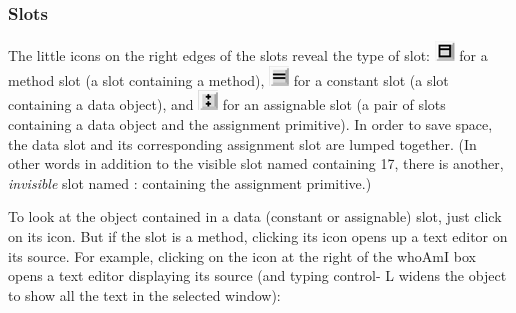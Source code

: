 \documentclass[letterpaper,10pt,english]{sphinxmanual}
\begin{document}
\subsubsection{Slots}
\label{howtoprg:slots}
The little icons on the right edges of the slots reveal the type of slot: \includegraphics{methodslot.png} for a method slot (a slot
containing a method), \includegraphics{constantslot.png} for a constant slot (a slot containing a data object), and \includegraphics{assignableslot.png} for an assignable
slot (a pair of slots containing a data object and the assignment primitive). In order to save
space, the data slot and its corresponding assignment slot are lumped together. (In other words in
addition to the visible slot named  containing 17, there is another, \emph{invisible}
slot named : containing the assignment primitive.)

To look at the object contained in a data (constant or assignable) slot, just click on its icon. But if
the slot is a method, clicking its icon opens up a text editor on its source. For example, clicking on
the icon at the right of the whoAmI box opens a text editor displaying its source (and typing control-
L widens the object to show all the text in the selected window):
\begin{figure}[htbp]\begin{flushleft}

\end{flushleft}\end{figure}
\end{document}
